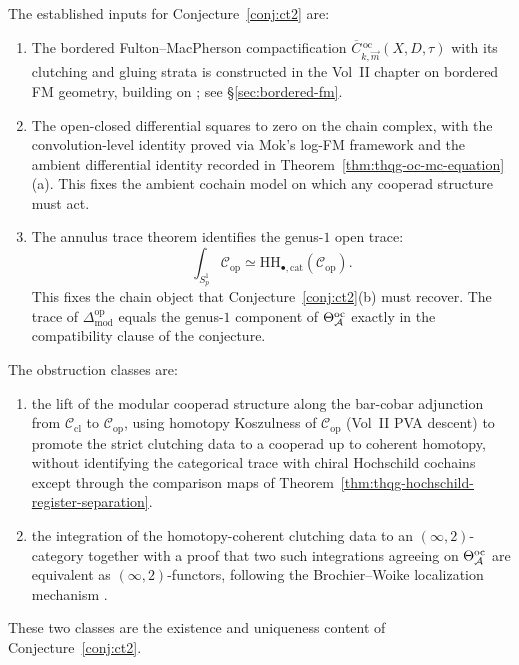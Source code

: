 \begin{remark}
\label{rem:ct2-proved-conjectural-loci}
The established inputs for Conjecture~\ref{conj:ct2} are:
\begin{enumerate}[label=\textup{(\roman*)}]
\item The bordered Fulton--MacPherson compactification
 $\overline{C}{}^{\,\mathrm{oc}}_{k,\vec{m}}(X, D, \tau)$ with its
 clutching and gluing strata is constructed in the Vol~II chapter
 on bordered FM geometry, building on
 \cite{KontsevichSoibelman}; see
 \S\ref{sec:bordered-fm}.
\item The open-closed differential squares to zero on
 the chain complex, with the convolution-level identity proved via
 Mok's log-FM framework and the ambient differential identity
 recorded in Theorem~\ref{thm:thqg-oc-mc-equation}(a). This fixes
 the ambient cochain model on which any cooperad structure must act.
\item The annulus trace theorem identifies the genus-$1$ open trace:
 \[
 \int_{S^1_p}\mathcal{C}_{\mathrm{op}}
 \simeq
 \mathrm{HH}_{\bullet,\mathrm{cat}}(\mathcal{C}_{\mathrm{op}}).
 \]
 This fixes the chain object that Conjecture~\ref{conj:ct2}(b)
 must recover. The trace of
 $\Delta^{\mathrm{op}}_{\mathrm{mod}}$ equals the genus-$1$
 component of $\Theta^{\mathrm{oc}}_{\mathcal{A}}$ exactly in the compatibility
 clause of the conjecture.
\end{enumerate}
The obstruction classes are:
\begin{enumerate}[label=\textup{(\roman*)}]
\item the lift of the modular cooperad structure along
 the bar-cobar adjunction from
 $\mathcal{C}_{\mathrm{cl}}$ to $\mathcal{C}_{\mathrm{op}}$,
 using homotopy Koszulness of $\mathcal{C}_{\mathrm{op}}$ (Vol~II
 PVA descent) to promote the strict clutching data to a cooperad
 up to coherent homotopy, without identifying the categorical
 trace with chiral Hochschild cochains except through the comparison
 maps of Theorem~\ref{thm:thqg-hochschild-register-separation}.
\item the integration of the homotopy-coherent clutching
 data to an $(\infty,2)$-category together with a proof that two such
 integrations agreeing on $\Theta^{\mathrm{oc}}_{\mathcal{A}}$ are equivalent
 as $(\infty,2)$-functors, following the Brochier--Woike
 localization mechanism \cite{BrochierWoike2022}.
\end{enumerate}
These two classes are the existence and uniqueness content of
Conjecture~\ref{conj:ct2}.
\end{remark}

